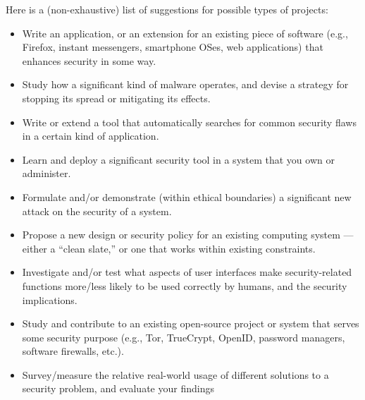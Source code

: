 \documentclass[11pt]{article}
\begin{document}
Here is a (non-exhaustive) list of suggestions for possible types of projects:
\begin{itemize}
\itemsep=-1pt
\item Write an application, or an extension for an existing piece of
  software (e.g., Firefox, instant messengers, smartphone OSes, web
  applications) that enhances security in some way.
\item Study how a signiﬁcant kind of malware operates, and devise a
  strategy for stopping its spread or mitigating its effects.
\item Write or extend a tool that automatically searches for common
  security ﬂaws in a certain kind of application.
\item Learn and deploy a signiﬁcant security tool in a system that you own or administer.
\item Formulate and/or demonstrate (within ethical boundaries) a
  signiﬁcant new attack on the security of a system.
\item Propose a new design or security policy for an existing computing
  system — either a “clean slate,” or one that works within existing
  constraints.
\item Investigate and/or test what aspects of user interfaces make
  security-related functions more/less likely to be used correctly by
  humans, and the security implications.
\item Study and contribute to an existing open-source project or system
  that serves some security purpose (e.g., Tor, TrueCrypt, OpenID,
  password managers, software ﬁrewalls, etc.).
\item Survey/measure the relative real-world usage of different
  solutions to a security problem, and evaluate your ﬁndings
\end{itemize}
\end{document}
